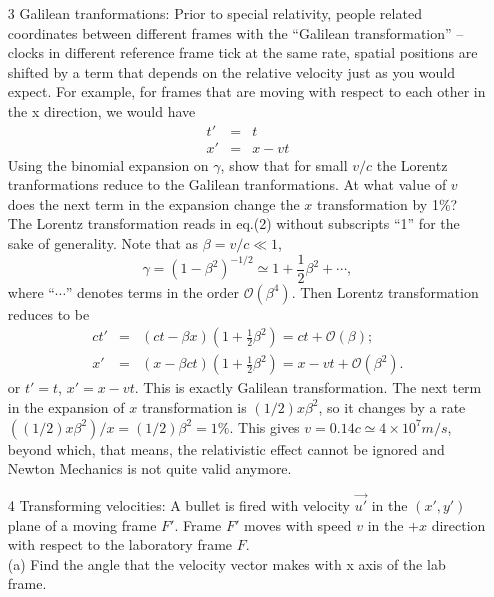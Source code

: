 \begin{enumerate}
\newpage

\item[3] Galilean tranformations: Prior to special relativity, 
people related coordinates between different frames 
with the ``Galilean transformation'' -- clocks in different 
reference frame tick at the same rate, spatial positions 
are shifted by a term that depends on the relative velocity 
just as you would expect. For example, for frames that are 
moving with respect to each other in the x direction, we would have
\begin{eqnarray}
t' &=& t\nonumber\\
x' &=& x-vt
\end{eqnarray}
Using the binomial expansion on $\gamma$, show that for 
small $v/c$ the Lorentz tranformations reduce to the Galilean 
tranformations. At what value of $v$ does the next term 
in the expansion change the $x$ transformation by 1\%?\\

The Lorentz transformation reads in eq.(2) without subscripts ``1''
for the sake of generality.  Note that as $\beta=v/c\ll 1$, 
\begin{equation}
\gamma=(1-\beta^2)^{-1/2}\simeq 1+\frac{1}{2}\beta^2+\cdots,
\end{equation}
where ``$\cdots$'' denotes terms in the order ${\mathcal{O}}(\beta^4)$.
Then Lorentz transformation reduces to be 
\begin{eqnarray}
ct'&=&(ct-\beta x)(1+\frac{1}{2}\beta^2)=ct+\mathcal{O}(\beta);\nonumber\\
x'&=& (x-\beta ct)(1+\frac{1}{2}\beta^2)=x-vt+{\mathcal{O}}(\beta^2).
\end{eqnarray}
or $t'=t$, $x'=x-vt$.  This is exactly Galilean transformation.  The
next term in the expansion of $x$ transformation is $(1/2)x\beta^2$,
so it changes by a rate $((1/2)x\beta^2)/x=(1/2)\beta^2=1\%$.  This gives
$v=0.14c\simeq 4\times 10^7 m/s$, beyond which, that means, the
relativistic effect cannot be ignored and Newton Mechanics is not quite
valid anymore.

\newpage

\item[4] Transforming velocities: A bullet is fired with velocity 
$\vec{u'}$ in the $(x', y')$ plane of a moving frame $F'$. 
Frame $F'$ moves with speed $v$ in the $+x$ direction 
with respect to the laboratory frame $F$.\\

(a) Find the angle that the velocity vector makes 
with x axis of the lab frame.\\


\end{enumerate}
